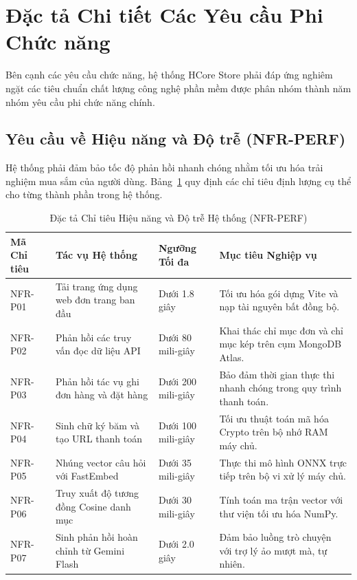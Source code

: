 \section{Đặc tả Chi tiết Các Yêu cầu Phi Chức năng}
Bên cạnh các yêu cầu chức năng, hệ thống HCore Store phải đáp ứng nghiêm ngặt các tiêu chuẩn chất lượng công nghệ phần mềm được phân nhóm thành năm nhóm yêu cầu phi chức năng chính.

\subsection{Yêu cầu về Hiệu năng và Độ trễ (NFR-PERF)}
Hệ thống phải đảm bảo tốc độ phản hồi nhanh chóng nhằm tối ưu hóa trải nghiệm mua sắm của người dùng. Bảng~\ref{tab:nfr_perf} quy định các chỉ tiêu định lượng cụ thể cho từng thành phần trong hệ thống.

\begin{table}[H]
\centering
\caption{Đặc tả Chỉ tiêu Hiệu năng và Độ trễ Hệ thống (NFR-PERF)}
\label{tab:nfr_perf}
\begin{tabularx}{\textwidth}{p{2.5cm}p{4cm}p{2.5cm}X}
\toprule
\textbf{Mã Chỉ tiêu} & \textbf{Tác vụ Hệ thống} & \textbf{Ngưỡng Tối đa} & \textbf{Mục tiêu Nghiệp vụ} \\
\midrule
NFR-P01 & Tải trang ứng dụng web đơn trang ban đầu & Dưới 1.8 giây & Tối ưu hóa gói dựng Vite và nạp tài nguyên bất đồng bộ. \\
NFR-P02 & Phản hồi các truy vấn đọc dữ liệu API & Dưới 80 mili-giây & Khai thác chỉ mục đơn và chỉ mục kép trên cụm MongoDB Atlas. \\
NFR-P03 & Phản hồi tác vụ ghi đơn hàng và đặt hàng & Dưới 200 mili-giây & Bảo đảm thời gian thực thi nhanh chóng trong quy trình thanh toán. \\
NFR-P04 & Sinh chữ ký băm và tạo URL thanh toán & Dưới 100 mili-giây & Tối ưu thuật toán mã hóa Crypto trên bộ nhớ RAM máy chủ. \\
NFR-P05 & Nhúng vector câu hỏi với FastEmbed & Dưới 35 mili-giây & Thực thi mô hình ONNX trực tiếp trên bộ vi xử lý máy chủ. \\
NFR-P06 & Truy xuất độ tương đồng Cosine danh mục & Dưới 30 mili-giây & Tính toán ma trận vector với thư viện tối ưu hóa NumPy. \\
NFR-P07 & Sinh phản hồi hoàn chỉnh từ Gemini Flash & Dưới 2.0 giây & Đảm bảo luồng trò chuyện với trợ lý ảo mượt mà, tự nhiên. \\
\bottomrule
\end{tabularx}
\end{table}

